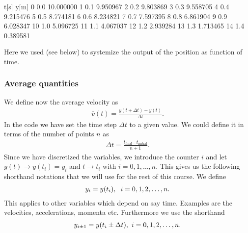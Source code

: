 \documentclass[letterpaper,10pt,english]{sphinxmanual}
\begin{document}
\begin{sphinxVerbatim}[commandchars=\\\{\}]
    t[s]       y[m]
0    0.0  10.000000
1    0.1   9.950967
2    0.2   9.803869
3    0.3   9.558705
4    0.4   9.215476
5    0.5   8.774181
6    0.6   8.234821
7    0.7   7.597395
8    0.8   6.861904
9    0.9   6.028347
10   1.0   5.096725
11   1.1   4.067037
12   1.2   2.939284
13   1.3   1.713465
14   1.4   0.389581
\end{sphinxVerbatim}

\noindent{}

Here we used  (see below) to systemize the output of the position as function of time.


\subsubsection{Average quantities}
\label{\detokenize{chapter2:average-quantities}}
We define now the average velocity as
\begin{equation*}
\begin{split}
\overline{v}(t) = \frac{y(t+\Delta t)-y(t)}{\Delta t}.
\end{split}
\end{equation*}
In the code we have set the time step \(\Delta t\) to a given value. We could define it in terms of the number of points \(n\) as
\begin{equation*}
\begin{split}
\Delta t = \frac{t_{\mathrm{final}-}t_{\mathrm{initial}}}{n+1}.
\end{split}
\end{equation*}
Since we have discretized the variables, we introduce the counter \(i\) and let \(y(t)\rightarrow y(t_i)=y_i\) and \(t\rightarrow t_i\)
with \(i=0,1,\dots, n\). This gives us the following shorthand notations that we will use for the rest of this course. We define
\begin{equation*}
\begin{split}
y_i = y(t_i),\hspace{0.2cm} i=0,1,2,\dots,n.
\end{split}
\end{equation*}
This applies to other variables which depend on say time. Examples are the velocities, accelerations, momenta etc.
Furthermore we use the shorthand
\begin{equation*}
\begin{split}
y_{i\pm 1} = y(t_i\pm \Delta t),\hspace{0.12cm} i=0,1,2,\dots,n.
\end{split}
\end{equation*}
\end{document}
